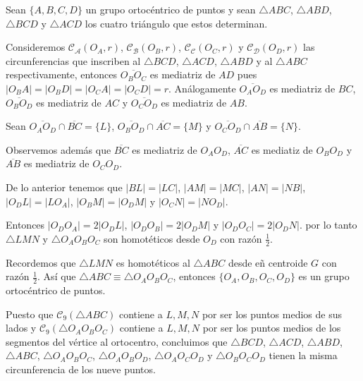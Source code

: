 \begin{dem}
Sean $\{A,B,C,D\}$ un grupo ortocéntrico de puntos y sean $\triangle ABC$, $\triangle ABD$, $\triangle BCD$ y $\triangle ACD$ los cuatro triángulo que estos determinan. 

Consideremos $\mathcal{C_{A}}(O_{A},r)$, $\mathcal{C_{B}}(O_{B},r)$, $\mathcal{C_{C}}(O_{C},r)$ y $\mathcal{C_{D}}(O_{D},r)$ las circunferencias que inscriben al $\triangle BCD$, $\triangle ACD$, $\triangle ABD$ y al $\triangle ABC$ respectivamente, entonces $\overline{O_{B}O_{C}}$ es mediatriz de $AD$ pues $|O_{B}A|=|O_{B}D|=|O_{C}A|=|O_{C}D|=r$. Análogamente $\overline{O_{A}O_{D}}$ es mediatriz de $BC$, $\overline{O_{B}O_{D}}$ es mediatriz de $AC$ y $\overline{O_{C}O_{D}}$ es mediatriz de $AB$. 

Sean $\overline{O_{A}O_{D}}\cap\overline{BC}=\{L\}$, $\overline{O_{B}O_{D}}\cap\overline{AC}=\{M\}$ y $\overline{O_{C}O_{D}}\cap\overline{AB}=\{N\}$.

Observemos además que $\overline{BC}$ es mediatriz de $O_{A}O_{D}$, $\overline{AC}$ es mediatiz de $O_{B}O_{D}$ y $\overline{AB}$ es mediatriz de $O_{C}O_{D}$.

De lo anterior tenemos que $|BL|=|LC|$, $|AM|=|MC|$, $|AN|=|NB|$, $|O_{D}L|=|LO_{A}|$, $|O_{B}M|=|O_{D}M|$ y $|O_{C}N|=|NO_{D}|$. 

Entonces $|O_{D}O_{A}|=2|O_{D}L|$, $|O_{D}O_{B}|=2|O_{D}M|$ y $|O_{D}O_{C}|=2|O_{D}N|$.
por lo tanto $\triangle LMN$ y $\triangle O_{A}O_{B}O_{C}$ son homotéticos desde $O_{D}$ con razón $\frac{1}{2}$. 

Recordemos que $\triangle LMN$ es homotéticos al $\triangle ABC$ desde eñ centroide $G$ con razón $\frac{1}{2}$. Así que $\triangle ABC\equiv\triangle O_{A}O_{B}O_{C}$, entonces $\{O_{A},O_{B},O_{C},O_{D}\}$ es un grupo ortocéntrico de puntos.

Puesto que $\mathcal{C}_{9}(\triangle ABC)$ contiene a $L,M,N$ por ser los puntos medios de sus lados y $\mathcal{C}_{9}(\triangle O_{A}O_{B}O_{C})$ contiene a $L,M,N$ por ser los puntos medios de los segmentos del vértice al ortocentro, concluimos que $\triangle BCD$, $\triangle ACD$, $\triangle ABD$, $\triangle ABC$, $\triangle O_{A}O_{B}O_{C}$, $\triangle O_{A}O_{B}O_{D}$, $\triangle O_{A}O_{C}O_{D}$ y $\triangle O_{B}O_{C}O_{D}$ tienen la misma circunferencia de los nueve puntos.
\end{dem}



